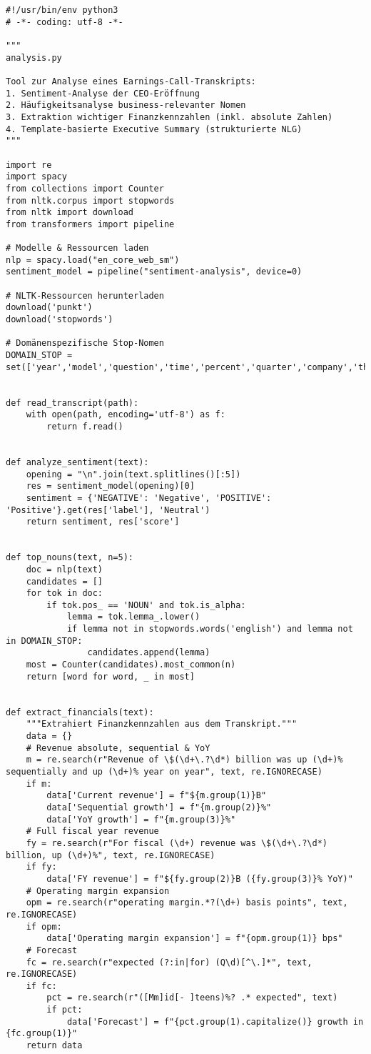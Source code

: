\documentclass[a4paper,12pt]{scrartcl}
\begin{document}
\begin{lstlisting}[style=mypythonstyle,caption={analysis.py mit Sentiment-, Topic- und Finanzanalyse}]
#!/usr/bin/env python3
# -*- coding: utf-8 -*-

"""
analysis.py

Tool zur Analyse eines Earnings-Call-Transkripts:
1. Sentiment-Analyse der CEO-Eröffnung
2. Häufigkeitsanalyse business-relevanter Nomen
3. Extraktion wichtiger Finanzkennzahlen (inkl. absolute Zahlen)
4. Template-basierte Executive Summary (strukturierte NLG)
"""

import re
import spacy
from collections import Counter
from nltk.corpus import stopwords
from nltk import download
from transformers import pipeline

# Modelle & Ressourcen laden
nlp = spacy.load("en_core_web_sm")
sentiment_model = pipeline("sentiment-analysis", device=0)

# NLTK-Ressourcen herunterladen
download('punkt')
download('stopwords')

# Domänenspezifische Stop-Nomen
DOMAIN_STOP = set(['year','model','question','time','percent','quarter','company','thank','call'])


def read_transcript(path):
    with open(path, encoding='utf-8') as f:
        return f.read()


def analyze_sentiment(text):
    opening = "\n".join(text.splitlines()[:5])
    res = sentiment_model(opening)[0]
    sentiment = {'NEGATIVE': 'Negative', 'POSITIVE': 'Positive'}.get(res['label'], 'Neutral')
    return sentiment, res['score']


def top_nouns(text, n=5):
    doc = nlp(text)
    candidates = []
    for tok in doc:
        if tok.pos_ == 'NOUN' and tok.is_alpha:
            lemma = tok.lemma_.lower()
            if lemma not in stopwords.words('english') and lemma not in DOMAIN_STOP:
                candidates.append(lemma)
    most = Counter(candidates).most_common(n)
    return [word for word, _ in most]


def extract_financials(text):
    """Extrahiert Finanzkennzahlen aus dem Transkript."""
    data = {}
    # Revenue absolute, sequential & YoY
    m = re.search(r"Revenue of \$(\d+\.?\d*) billion was up (\d+)% sequentially and up (\d+)% year on year", text, re.IGNORECASE)
    if m:
        data['Current revenue'] = f"${m.group(1)}B"
        data['Sequential growth'] = f"{m.group(2)}%"
        data['YoY growth'] = f"{m.group(3)}%"
    # Full fiscal year revenue
    fy = re.search(r"For fiscal (\d+) revenue was \$(\d+\.?\d*) billion, up (\d+)%", text, re.IGNORECASE)
    if fy:
        data['FY revenue'] = f"${fy.group(2)}B ({fy.group(3)}% YoY)"
    # Operating margin expansion
    opm = re.search(r"operating margin.*?(\d+) basis points", text, re.IGNORECASE)
    if opm:
        data['Operating margin expansion'] = f"{opm.group(1)} bps"
    # Forecast
    fc = re.search(r"expected (?:in|for) (Q\d)[^\.]*", text, re.IGNORECASE)
    if fc:
        pct = re.search(r"([Mm]id[- ]teens)%? .* expected", text)
        if pct:
            data['Forecast'] = f"{pct.group(1).capitalize()} growth in {fc.group(1)}"
    return data



\end{lstlisting}
\end{document}
